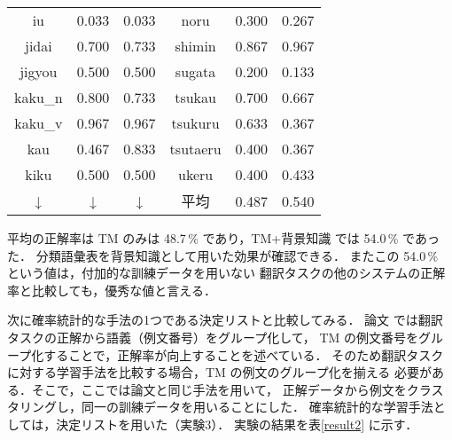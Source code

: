 \begin{table}[htbp]
\begin{center}
\begin{tabular}{|c|c|c||c|c|c|}
        iu &  0.033   &    0.033   &        noru &  0.300   &    0.267  \\
     jidai &  0.700   &    0.733   &      shimin &  0.867   &    0.967  \\
    jigyou &  0.500   &    0.500   &      sugata &  0.200   &    0.133  \\
    kaku\_n &  0.800  &    0.733   &      tsukau &  0.700   &    0.667  \\
    kaku\_v &  0.967  &    0.967   &     tsukuru &  0.633   &    0.367  \\
       kau &  0.467   &    0.833   &    tsutaeru &  0.400   &    0.367  \\
      kiku &  0.500   &    0.500   &       ukeru &  0.400   &    0.433  \\ \hline
   ↓       &   ↓    &     ↓     &   平均       &  0.487   &    0.540  \\  \hline
    \end{tabular}
  \end{center}
\end{table}

平均の正解率は TM のみは 48.7\,\% であり，TM+背景知識 では 54.0\,\% であった．
分類語彙表を背景知識として用いた効果が確認できる．
またこの 54.0\,\% という値は，付加的な訓練データを用いない
翻訳タスクの他のシステムの正解率と比較しても，優秀な値と言える．

次に確率統計的な手法の1つである決定リストと比較してみる．
論文\cite{shinnou-sen2} では翻訳タスクの正解から語義（例文番号）をグループ化して，
TM の例文番号をグループ化することで，正解率が向上することを述べている．
そのため翻訳タスクに対する学習手法を比較する場合，TM の例文のグループ化を揃える
必要がある．そこで，ここでは論文\cite{shinnou-sen2}と同じ手法を用いて，
正解データから例文をクラスタリングし，同一の訓練データを用いることにした．
確率統計的な学習手法としては，決定リストを用いた（実験3）．
実験の結果を\mbox{表\ref{result2}} に示す．

